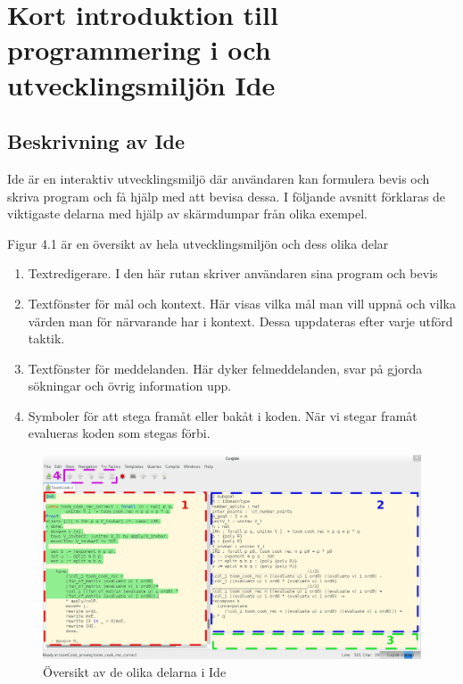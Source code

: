 \section{Kort introduktion till programmering i \coq{} och utvecklingsmiljön
\coq{} Ide}

\subsection{Beskrivning av \coq{} Ide}


\coq Ide är en interaktiv utvecklingsmiljö där användaren kan
formulera bevis och skriva program och få hjälp med att bevisa
dessa. I följande avsnitt förklaras de viktigaste delarna med
hjälp av skärmdumpar från olika exempel.


Figur 4.1 är en översikt av hela utvecklingsmiljön och dess olika delar
\begin{enumerate}
\item Textredigerare. I den här rutan skriver användaren sina program och bevis
\item Textfönster för mål och kontext. Här visas vilka mål man vill uppnå och
  vilka värden man för närvarande har i kontext. Dessa uppdateras efter varje
  utförd taktik.
\item Textfönster för meddelanden. Här dyker felmeddelanden, svar på
  gjorda sökningar och övrig information upp.
\item Symboler för att stega framåt eller bakåt i koden. När vi stegar framåt
  evalueras koden som stegas förbi.
\end{enumerate}

\begin{figure}[H]
  \centering
  \includegraphics[width=\textwidth]{images/Overview}
  \caption[Översikt av \coq{} Ide]
   {Översikt av de olika delarna i \coq{} Ide}
\end{figure}

